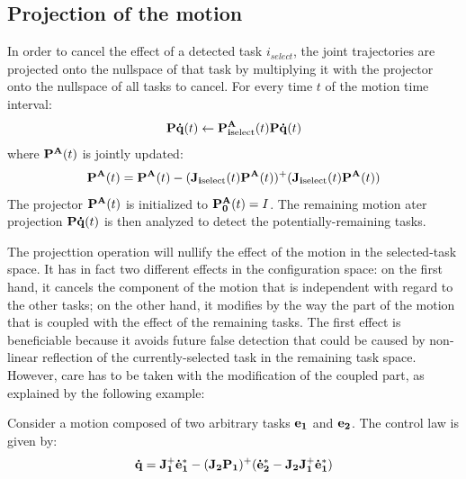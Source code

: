 \documentclass[letterpaper, 10pt, conference]{ieeeconf}      %
\begin{document}
\subsection{Projection of the motion}
In order to cancel the effect of a detected task $i_{select}$, the joint trajectories are projected onto the nullspace
of that task by multiplying it with the projector onto the nullspace of all tasks to cancel.
For every time $t$ of the motion time interval:
\begin{equation}
  {\mathbf{P\dot{q}}}(t) \leftarrow {\mathbf{P^A_{i\mathrm{select}}}}(t) {\mathbf{P\dot{q}}}(t) 
  \label{eq:projection}
\end{equation}
where $ {\mathbf{P^A}}(t)$ is jointly updated:
\begin{equation*}
  {\mathbf{P^A}}(t) = {\mathbf{P^A}}(t) - ({\mathbf{J_{i\mathrm{select}}}}(t){\mathbf{P^A}}(t))^+({\mathbf{J_{i\mathrm{select}}}}(t){\mathbf{P^A}}(t))
  \label{eq:projectionupdate}
\end{equation*}
The projector ${\mathbf{P^A}}(t)$ is initialized to ${\mathbf{P^A_0}}(t) = I$. The
remaining motion ater projection ${\mathbf{P\dot{q}}}(t) $ is then analyzed to
detect the potentially-remaining tasks.

The projecttion operation will nullify the effect of the motion in the
selected-task space. It has in fact two different effects in the configuration
space: on the first hand, it cancels the component of the motion that is
independent with regard to the other tasks; on the other hand, it modifies by
the way the part of the motion that is coupled with the effect of the remaining
tasks. The first effect is beneficiable because it avoids future false
detection that could be caused by non-linear reflection of the
currently-selected task in the remaining task space. However, care has to be taken with the modification of the coupled part, as explained by the following example:

Consider a motion composed of two arbitrary tasks ${\mathbf{e_1}}$ and ${\mathbf{e_2}}$.
The control law is given by:
\begin{equation}
  {\mathbf{\dot{q}}} = {\mathbf{J_1^+}}{\mathbf{\dot{e}_1^*}} - ({\mathbf{J_2}}{\mathbf{P_1}})^+ ({\mathbf{\dot{e}_2^*}} - {\mathbf{J_2}}{\mathbf{J_1^+}}{\mathbf{\dot{e}_1^*}})
  \label{eq:controlLaw2Tasks}
\end{equation}
\end{document}
